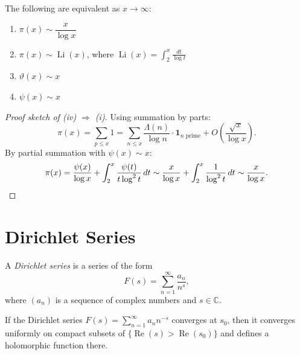 \begin{theorem}
  The following are equivalent as $x \to \infty$:
  \begin{enumerate}[label=(\roman*)]
    \item $\pi(x) \sim \dfrac{x}{\log x}$
    \item $\pi(x) \sim \operatorname{Li}(x)$, where $\operatorname{Li}(x) = \displaystyle\int_2^x \frac{dt}{\log t}$
    \item $\vartheta(x) \sim x$
    \item $\psi(x) \sim x$
  \end{enumerate}
\end{theorem}

\begin{proof}[Proof sketch of (iv) $\Rightarrow$ (i)]
  Using summation by parts:
  \begin{equation}
    \pi(x) = \sum_{p \leq x} 1 = \sum_{n \leq x} \frac{\Lambda(n)}{\log n} \cdot \mathbf{1}_{n \text{ prime}} + O\left(\frac{\sqrt{x}}{\log x}\right).
  \end{equation}
  By partial summation with $\psi(x) \sim x$:
  \begin{equation}
    \pi(x) = \frac{\psi(x)}{\log x} + \int_2^x \frac{\psi(t)}{t \log^2 t} \, dt \sim \frac{x}{\log x} + \int_2^x \frac{1}{\log^2 t} \, dt \sim \frac{x}{\log x}. \qedhere
  \end{equation}
\end{proof}

\section{Dirichlet Series}

\begin{definition}
  A \emph{Dirichlet series} is a series of the form
  \begin{equation}
    F(s) = \sum_{n=1}^{\infty} \frac{a_n}{n^s},
  \end{equation}
  where $(a_n)$ is a sequence of complex numbers and $s \in \mathbb{C}$.
\end{definition}

\begin{theorem}
  If the Dirichlet series $F(s) = \sum_{n=1}^{\infty} a_n n^{-s}$ converges at $s_0$, then it converges uniformly on compact subsets of $\{\operatorname{Re}(s) > \operatorname{Re}(s_0)\}$ and defines a holomorphic function there.
\end{theorem}

